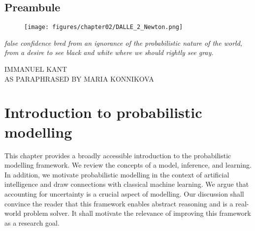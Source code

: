 \thispagestyle{empty}
\section*{Preambule}


\begin{figure}[h]
  \centering

  \texttt{[image: figures/chapter02/DALLE\_2\_Newton.png]}
  \label{}
\end{figure}

\vfill

{
\textit{ false confidence bred from an ignorance of the probabilistic nature of the world, from a desire to see black and white where we should rightly see gray.}

  \par\bigskip
  \raggedleft\MakeUppercase{Immanuel Kant}\\
  \raggedleft\MakeUppercase{AS PARAPHRASED BY MARIA KONNIKOVA}
  \par%
}


\chapter{Introduction to probabilistic modelling}\label{ch:02A}

\begin{chapter_outline}

  This chapter provides a broadly accessible introduction to the probabilistic modelling framework.
  We review the concepts of a model, inference, and learning. In addition, we motivate probabilistic modelling in the context of artificial intelligence and draw connections with classical machine learning. We argue that accounting for uncertainty is a crucial aspect of modelling. Our discussion shall convince the reader that this framework enables abstract reasoning and is a real-world problem solver. It shall motivate the relevance of improving this framework as a research goal.
\end{chapter_outline}

